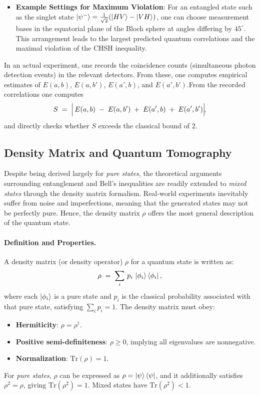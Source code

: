 \begin{itemize}
    \item \textbf{Example Settings for Maximum Violation}: For an entangled state such as the singlet state $\ket{\psi^-}=\frac{1}{\sqrt{2}}(\ket{HV}-\ket{VH})$, one can choose measurement bases in the equatorial plane of the Bloch sphere at angles differing by $45^\circ$. This arrangement leads to the largest predicted quantum correlations and the maximal violation of the CHSH inequality.
\end{itemize}

\noindent
In an actual experiment, one records the coincidence counts (simultaneous photon detection events) in the relevant detectors. From these, one computes empirical estimates of $E(a,b)$, $E(a,b')$, $E(a',b)$, and $E(a',b')$.From the recorded correlations one computes
\[
  S \;=\;\Bigl|\,E(a,b)\;-\;E(a,b')\;+\;E(a',b)\;+\;E(a',b')\Bigr|\!,
\]
and directly checks whether \(S\) exceeds the classical bound of 2.


\subsection{Density Matrix and Quantum Tomography}
\label{subsec:tomography}
Despite being derived largely for \emph{pure states}, the theoretical arguments surrounding entanglement and Bell's inequalities are readily extended to \emph{mixed states} through the density matrix formalism. Real-world experiments inevitably suffer from noise and imperfections, meaning that the generated states may not be perfectly pure. Hence, the density matrix $\rho$ offers the most general description of the quantum state.

\paragraph{Definition and Properties.}
A density matrix (or density operator) $\rho$ for a quantum state is written as:
\[
\rho \;=\; \sum_i \,p_i\,\ket{\phi_i}\bra{\phi_i},
\]
where each $\ket{\phi_i}$ is a pure state and $p_i$ is the classical probability associated with that pure state, satisfying $\sum_i p_i=1$. The density matrix must obey:
\begin{itemize}
    \item \textbf{Hermiticity}: $\rho = \rho^\dagger$. 
    \item \textbf{Positive semi-definiteness}: $\rho \ge 0$, implying all eigenvalues are nonnegative.
    \item \textbf{Normalization}: $\mathrm{Tr}(\rho) = 1$.
\end{itemize}
For \emph{pure states}, $\rho$ can be expressed as $\rho=\ket{\psi}\bra{\psi}$, and it additionally satisfies $\rho^2=\rho$, giving $\mathrm{Tr}(\rho^2)=1$. Mixed states have $\mathrm{Tr}(\rho^2) <1$.

